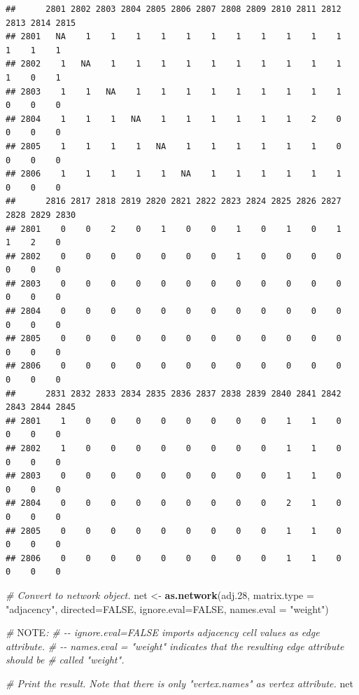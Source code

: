 \documentclass[
]{book}
\newenvironment{Shaded}{\begin{snugshade}}{\end{snugshade}}
\newcommand{\AlertTok}[1]{\textcolor[rgb]{0.94,0.16,0.16}{#1}}
\newcommand{\AttributeTok}[1]{\textcolor[rgb]{0.13,0.29,0.53}{#1}}
\newcommand{\CommentTok}[1]{\textcolor[rgb]{0.56,0.35,0.01}{\textit{#1}}}
\newcommand{\ConstantTok}[1]{\textcolor[rgb]{0.56,0.35,0.01}{#1}}
\newcommand{\FloatTok}[1]{\textcolor[rgb]{0.00,0.00,0.81}{#1}}
\newcommand{\FunctionTok}[1]{\textcolor[rgb]{0.13,0.29,0.53}{\textbf{#1}}}
\newcommand{\NormalTok}[1]{#1}
\newcommand{\OtherTok}[1]{\textcolor[rgb]{0.56,0.35,0.01}{#1}}
\newcommand{\StringTok}[1]{\textcolor[rgb]{0.31,0.60,0.02}{#1}}
\begin{document}
\begin{verbatim}
##      2801 2802 2803 2804 2805 2806 2807 2808 2809 2810 2811 2812 2813 2814 2815
## 2801   NA    1    1    1    1    1    1    1    1    1    1    1    1    1    1
## 2802    1   NA    1    1    1    1    1    1    1    1    1    1    1    0    1
## 2803    1    1   NA    1    1    1    1    1    1    1    1    1    0    0    0
## 2804    1    1    1   NA    1    1    1    1    1    1    2    0    0    0    0
## 2805    1    1    1    1   NA    1    1    1    1    1    1    0    0    0    0
## 2806    1    1    1    1    1   NA    1    1    1    1    1    1    0    0    0
##      2816 2817 2818 2819 2820 2821 2822 2823 2824 2825 2826 2827 2828 2829 2830
## 2801    0    0    2    0    1    0    0    1    0    1    0    1    1    2    0
## 2802    0    0    0    0    0    0    0    1    0    0    0    0    0    0    0
## 2803    0    0    0    0    0    0    0    0    0    0    0    0    0    0    0
## 2804    0    0    0    0    0    0    0    0    0    0    0    0    0    0    0
## 2805    0    0    0    0    0    0    0    0    0    0    0    0    0    0    0
## 2806    0    0    0    0    0    0    0    0    0    0    0    0    0    0    0
##      2831 2832 2833 2834 2835 2836 2837 2838 2839 2840 2841 2842 2843 2844 2845
## 2801    1    0    0    0    0    0    0    0    0    1    1    0    0    0    0
## 2802    1    0    0    0    0    0    0    0    0    1    1    0    0    0    0
## 2803    0    0    0    0    0    0    0    0    0    1    1    0    0    0    0
## 2804    0    0    0    0    0    0    0    0    0    2    1    0    0    0    0
## 2805    0    0    0    0    0    0    0    0    0    1    1    0    0    0    0
## 2806    0    0    0    0    0    0    0    0    0    1    1    0    0    0    0
\end{verbatim}

\begin{Shaded}
\begin{Highlighting}[]
\CommentTok{\# Convert to network object.}
\NormalTok{net }\OtherTok{\textless{}{-}} \FunctionTok{as.network}\NormalTok{(adj}\FloatTok{.28}\NormalTok{, }\AttributeTok{matrix.type =} \StringTok{"adjacency"}\NormalTok{, }\AttributeTok{directed=}\ConstantTok{FALSE}\NormalTok{, }
                  \AttributeTok{ignore.eval=}\ConstantTok{FALSE}\NormalTok{, }\AttributeTok{names.eval =} \StringTok{"weight"}\NormalTok{)}

\CommentTok{\# }\AlertTok{NOTE}\CommentTok{: }
\CommentTok{\# {-}{-} ignore.eval=FALSE imports adjacency cell values as edge attribute.}
\CommentTok{\# {-}{-} names.eval = "weight" indicates that the resulting edge attribute should be}
\CommentTok{\# called "weight".}

\CommentTok{\# Print the result. Note that there is only "vertex.names" as vertex attribute.}
\NormalTok{net}
\end{Highlighting}
\end{Shaded}
\end{document}
